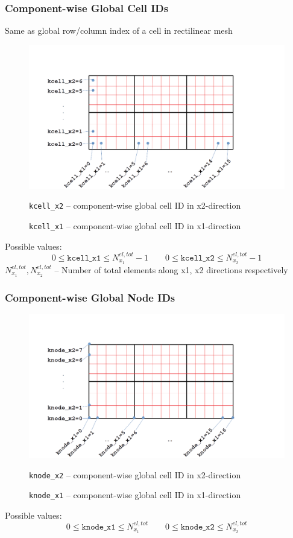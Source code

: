 \documentclass[a4paper,12pt]{article}
\begin{document}
\subsubsection{Component-wise Global Cell IDs}
Same as global row/column index of a cell in rectilinear mesh
\begin{figure}[H]
	\centering
	\includegraphics[trim=50 0 200 120,clip,scale=0.3]{figures/global_1D_cell_ID.png}
	\caption{\texttt{kcell\_x1} -- component-wise global cell ID in x1-direction}{\texttt{kcell\_x2} -- component-wise global cell ID in x2-direction}			
\end{figure}
\noindent Possible values:
\begin{equation*}
0 \le \texttt{kcell\_x1} \le N^{el,tot}_{x_1}-1 \qquad 0 \le \texttt{kcell\_x2} \le N^{el,tot}_{x_2}-1
\end{equation*}
$N^{el,tot}_{x_1},N^{el,tot}_{x_2}$ -- Number of total elements along x1, x2 directions respectively

\subsubsection{Component-wise Global Node IDs}
\begin{figure}[H]
	\centering
	\includegraphics[trim=50 0 200 100,clip,scale=0.35]{figures/global_1D_node_ID.png}
	\caption{\texttt{knode\_x1} -- component-wise global cell ID in x1-direction}{\texttt{knode\_x2} -- component-wise global cell ID in x2-direction}			
\end{figure}
\noindent Possible values:
\begin{equation*}
0 \le \texttt{knode\_x1} \le N^{el,tot}_{x_1} \qquad 0 \le \texttt{knode\_x2} \le N^{el,tot}_{x_2}
\end{equation*}
\end{document}
